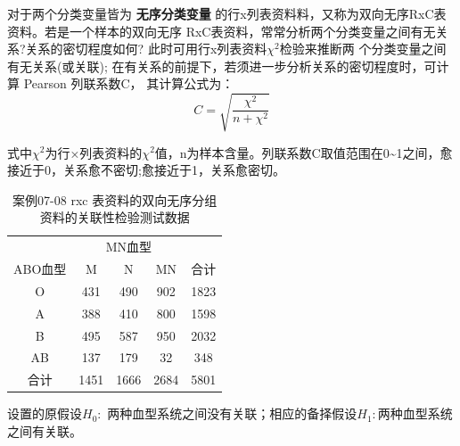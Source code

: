 \documentclass[
]{article}
\begin{document}
对于两个分类变量皆为 \textbf{无序分类变量} 的行x列表资料料，又称为双向无序RxC表资料。若是一个样本的双向无序
RxC表资料，常常分析两个分类变量之间有无关系?关系的密切程度如何? 此时可用行x列表资料\(\chi^2\)检验来推断两
个分类变量之间有无关系(或关联); 在有关系的前提下，若须进一步分析关系的密切程度时，可计算 Pearson 列联系数C，
其计算公式为：
\[C=\sqrt{\frac{\chi^2}{n+\chi^2}}\]

式中\(\chi^2\)为行×列表资料的\(\chi^2\)值，n为样本含量。列联系数C取值范围在0\textasciitilde1之间，愈接近于0，关系愈不密切;愈接近于1，关系愈密切。

\begin{table}

\caption{\label{tab:chisqtab6}案例07-08 rxc 表资料的双向无序分组资料的关联性检验测试数据}
\centering
\begin{tabular}[t]{ccccc}
\toprule
\multicolumn{1}{c}{ } & \multicolumn{3}{c}{MN血型} & \multicolumn{1}{c}{ } \\
\cmidrule(l{3pt}r{3pt}){2-4}
ABO血型 & M & N & MN & 合计\\
\midrule
O & 431 & 490 & 902 & 1823\\
A & 388 & 410 & 800 & 1598\\
B & 495 & 587 & 950 & 2032\\
AB & 137 & 179 & 32 & 348\\
合计 & 1451 & 1666 & 2684 & 5801\\
\bottomrule
\end{tabular}
\end{table}

设置的原假设\(H_0:\) 两种血型系统之间没有关联；相应的备择假设\(H_1:\)两种血型系统之间有关联。
\end{document}
